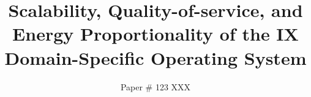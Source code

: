 \documentclass[10pt,twocolumn]{article}
\begin{document}

\newcommand{\ix}[0]{\textsc{ix}\xspace}

\title{ Scalability, Quality-of-service, and Energy Proportionality of the IX Domain-Specific Operating System}


\author{Paper \# 123 XXX}
\date{}
\maketitle
\thispagestyle{empty}





%






 
\end{document}
